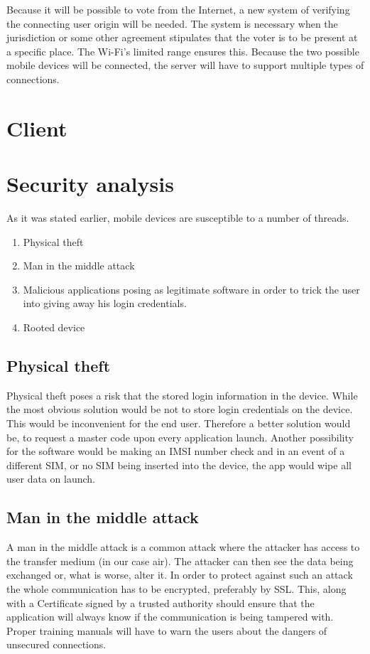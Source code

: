 \documentclass[11pt,twoside,a4paper]{book}
\begin{document}







Because it will be possible to vote from the Internet, a new system of verifying the connecting user origin will be needed. The system is necessary when the jurisdiction or some other agreement stipulates that the voter is to be present at a specific place. The Wi-Fi's limited range ensures this. Because the two possible mobile devices will be connected, the server will have to support multiple types of connections.

\section{Client}


\section{Security analysis}
\label{sec:security}
As it was stated earlier, mobile devices are susceptible to a number of threads. 
\begin{enumerate}
\item Physical theft
\item Man in the middle attack
\item Malicious applications posing as legitimate software in order to trick the user into giving away his login credentials.
\item Rooted device
\end{enumerate}
\subsection{Physical theft}
Physical theft poses a risk that the stored login information in the device. While the most obvious solution would be not to store login credentials on the device. This would be inconvenient for the end user. Therefore a better solution would be, to request a master code upon every application launch. Another possibility for the software would be making an IMSI number check and in an event of a different SIM, or no SIM being inserted into the device, the app would wipe all user data on launch. 
\subsection{Man in the middle attack}
A man in the middle attack is a common attack where the attacker has access to the transfer medium (in our case air). The attacker can then see the data being exchanged or, what is worse, alter it. In order to protect against such an attack the whole communication has to be encrypted, preferably by SSL. This, along with a Certificate signed by a trusted authority should ensure that the application will always know if the communication is being tampered with. Proper training manuals will have to warn the users about the dangers of unsecured connections.
\end{document}
